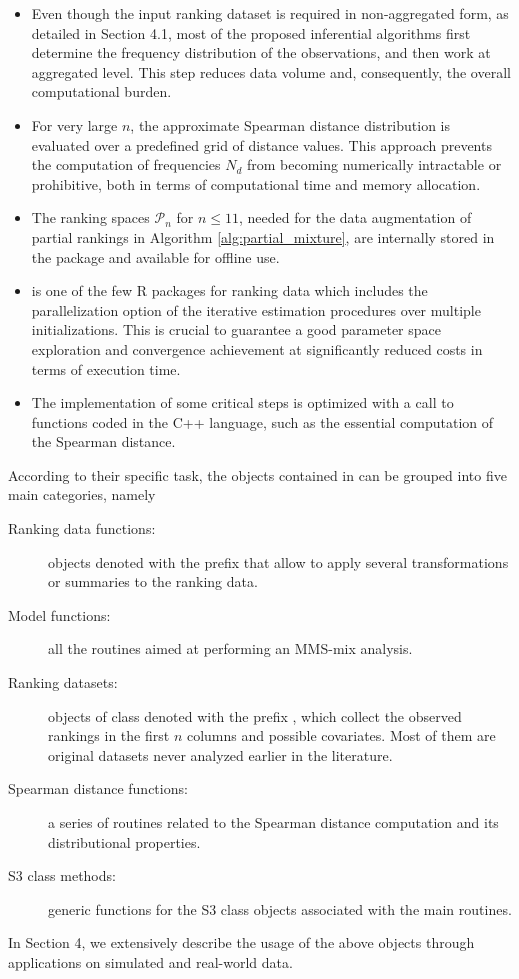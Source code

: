 \begin{itemize}
    \item Even though the input ranking dataset is required in non-aggregated form, as detailed in Section
    4.1, most of the proposed inferential algorithms first determine the frequency distribution of the observations, and then work at aggregated level. This step reduces data volume and, consequently, the overall computational burden.
    \item For very large $n$, the approximate Spearman distance distribution is evaluated over a predefined grid of distance values. This approach prevents the computation of frequencies $N_d$ from becoming numerically intractable or prohibitive, both in terms of computational time and memory allocation.
    \item The ranking spaces $\mathcal{P}_n$ for $n\leq 11$, needed for the data augmentation of partial rankings in Algorithm \ref{alg:partial_mixture}, are internally stored in the package and available for offline use.
    \item {} is one of the few \textsf{R} packages for ranking data which includes the parallelization option of the iterative estimation procedures over multiple initializations. This is crucial to guarantee a good parameter space exploration and convergence achievement at significantly reduced costs in terms of execution time.  \item The implementation of some critical steps is optimized with a call to functions coded in the \textsf{C++} language, such as the essential computation of the Spearman distance.
\end{itemize}

According to their specific task, the objects contained in  can be grouped into five main categories,
namely
\begin{description}
\item[Ranking data functions:] objects denoted with the prefix  that allow to apply several transformations or summaries to the ranking data.
\item[Model functions:] all the routines aimed at performing an MMS-mix analysis.
\item[Ranking datasets:] objects of class  denoted with the prefix , which collect the observed rankings in the first $n$ columns and possible covariates. Most of them are original datasets never analyzed earlier in the literature.
\item[Spearman distance functions:] a series of routines related to the Spearman distance computation and its distributional properties.
\item[S3 class methods:] generic functions for the S3 class objects associated with the main routines.
\end{description}
%
In Section
4, we extensively describe the usage of the above objects through applications on simulated and real-world data.

